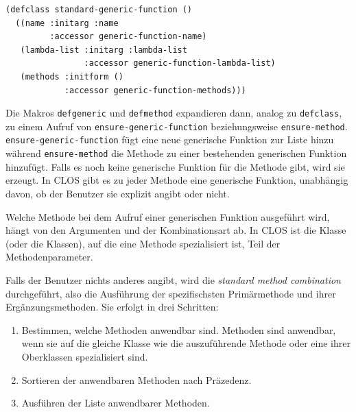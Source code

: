 \begin{lstlisting}
(defclass standard-generic-function ()
  ((name :initarg :name
         :accessor generic-function-name)
   (lambda-list :initarg :lambda-list
                :accessor generic-function-lambda-list)
   (methods :initform ()
            :accessor generic-function-methods)))
\end{lstlisting}

Die Makros \texttt{defgeneric} und \texttt{defmethod} expandieren dann, analog zu \texttt{defclass}, zu einem Aufruf von \texttt{ensure-generic-function} beziehungsweise \texttt{ensure-method}. \texttt{ensure-generic-function} fügt eine neue generische Funktion zur Liste hinzu während \texttt{ensure-method} die Methode zu einer bestehenden generischen Funktion hinzufügt. Falls es noch keine generische Funktion für die Methode gibt, wird sie erzeugt. In CLOS gibt es zu jeder Methode eine generische Funktion, unabhängig davon, ob der Benutzer sie explizit angibt oder nicht.

Welche Methode bei dem Aufruf einer generischen Funktion ausgeführt wird, hängt von den Argumenten und der Kombinationsart ab. In CLOS ist die Klasse (oder die Klassen), auf die eine Methode spezialisiert ist, Teil der Methodenparameter. 

Falls der Benutzer nichts anderes angibt, wird die \emph{standard method combination} durchgeführt, also die Ausführung der spezifischsten Primärmethode und ihrer Ergänzungsmethoden. Sie erfolgt in drei Schritten:
\begin{enumerate}
 \item Bestimmen, welche Methoden anwendbar sind. Methoden sind anwendbar, wenn sie auf die gleiche Klasse wie die auszuführende Methode oder eine ihrer Oberklassen spezialisiert sind.
 \item Sortieren der anwendbaren Methoden nach Präzedenz.
 \item Ausführen der Liste anwendbarer Methoden.
\end{enumerate}

